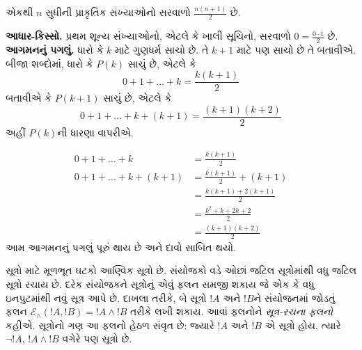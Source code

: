 \begin{ex}
એકથી $n$ સુધીની પ્રાકૃતિક સંખ્યાઓનો સરવાળો
$\frac{n(n+1)}{2}$ છે. \\

\textbf{આધાર-કિસ્સો.} પ્રથમ શૂન્ય સંખ્યાઓનો, એટલે કે ખાલી
સૂચિનો, સરવાળો $0=
\frac{0\cdot 1}{2}$ છે.\\

\textbf{આગમનનું પગલું.} ધારો કે $k$ માટે ગુણધર્મ સાચો છે.
તે $k+1$ માટે પણ સાચો છે તે બતાવીએ.
બીજા શબ્દોમાં, ધારો કે $P(k)$ સાચું છે, એટલે કે
\[ 0 + 1 + \ldots + k = \frac{k(k+1)}{2} \]
બતાવીએ કે $P(k+1)$ સાચું છે, એટલે કે
\[ 0 + 1 + \ldots + k + (k+1) = \frac{(k+1)(k+2)}{2} \]
અહીં $P(k)$ની ધારણા વાપરીએ.

\begin{align*}
0 + 1 + \ldots + k &= \frac{k(k+1)}{2} \tag{ધારણા} \\
0 + 1 + \ldots + k + (k+1) &= \frac{k(k+1)}{2} + (k+1)
\tag{બંને બાજુએ $k+1$ ઉમેરો} \\
&= \frac{k(k+1) + 2(k+1)}{2} \\
&= \frac{k^2 + k + 2k +2}{2} \\
&=\frac{(k+1)(k+2)}{2}
\end{align*}
આમ આગમનનું પગલું પૂરું થાય છે અને દાવો સાબિત થયો.
\end{ex}

\begin{explain}
સૂત્રો માટે મૂળભૂત ઘટકો આણ્વિક સૂત્રો છે.
સંયોજકો વડે ઓછાં જટિલ સૂત્રોમાંથી વધુ જટિલ
સૂત્રો રચાય છે. દરેક સંયોજકને સૂત્રોનું
એવું ફલન સમજી શકાય જે એક કે વધુ ઇનપુટમાંથી નવું
સૂત્ર આપે છે. દાખલા તરીકે, બે સૂત્રો
$!A$ અને $!B$ને સંયોજનમાં જોડતું ફલન
$\mathcal E _\land (!A,
!B) = !A \land !B$ તરીકે લખી શકાય.
આવાં ફલનોને \emph{સૂત્ર-રચના ફલનો} કહીએ.
સૂત્રોનો ગણ આ ફલનો હેઠળ સંવૃત છે:
જ્યારે $!A$ અને $!B$ એ સૂત્રો હોય, ત્યારે
$\lnot !A$, $!A \land !B$ વગેરે પણ સૂત્રો છે.
\end{explain}

